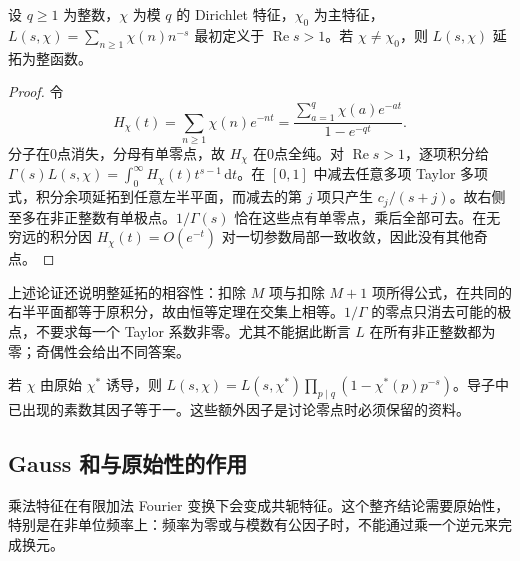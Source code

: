 \begin{proposition}[非主特征的整延拓]\label{b3:prop:D-entire-continuation}
设 \(q\ge1\) 为整数，\(\chi\) 为模 \(q\) 的 Dirichlet 特征，\(\chi_0\) 为主特征，\(L(s,\chi)=\sum_{n\ge1}\chi(n)n^{-s}\) 最初定义于 \(\operatorname{Re}s>1\)。若 \(\chi\ne\chi_0\)，则 \(L(s,\chi)\) 延拓为整函数。
\end{proposition}
\begin{proof}
令
\[
 H_\chi(t)=\sum_{n\ge1}\chi(n)e^{-nt}
   =\frac{\sum_{a=1}^q\chi(a)e^{-at}}{1-e^{-qt}}.
\]
分子在0点消失，分母有单零点，故 \(H_\chi\) 在0点全纯。对 \(\operatorname{Re}s>1\)，逐项积分给
\(\Gamma(s)L(s,\chi)=\int_0^\infty H_\chi(t)t^{s-1}\,\mathrm{d}t\)。在 \([0,1]\) 中减去任意多项 Taylor 多项式，积分余项延拓到任意左半平面，而减去的第 \(j\) 项只产生 \(c_j/(s+j)\)。故右侧至多在非正整数有单极点。\(1/\Gamma(s)\) 恰在这些点有单零点，乘后全部可去。在无穷远的积分因 \(H_\chi(t)=O(e^{-t})\) 对一切参数局部一致收敛，因此没有其他奇点。
\end{proof}
上述论证还说明整延拓的相容性：扣除 \(M\) 项与扣除 \(M+1\) 项所得公式，在共同的右半平面都等于原积分，故由恒等定理在交集上相等。\(1/\Gamma\) 的零点只消去可能的极点，不要求每一个 Taylor 系数非零。尤其不能据此断言 \(L\) 在所有非正整数都为零；奇偶性会给出不同答案。

若 \(\chi\) 由原始 \(\chi^*\) 诱导，则
\(L(s,\chi)=L(s,\chi^*)\prod_{p\mid q}(1-\chi^*(p)p^{-s})\)。导子中已出现的素数其因子等于一。这些额外因子是讨论零点时必须保留的资料。

\subsection{Gauss 和与原始性的作用}
\label{b3:subsec:D0203}

乘法特征在有限加法 Fourier 变换下会变成共轭特征。这个整齐结论需要原始性，特别是在非单位频率上：频率为零或与模数有公因子时，不能通过乘一个逆元来完成换元。

